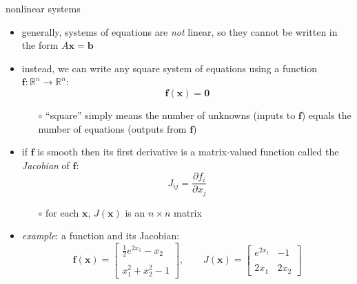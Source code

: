 \documentclass[10pt,hyperref]{beamer}
\newcommand{\bb}{\mathbf{b}}
\newcommand{\bbf}{\mathbf{f}}
\newcommand{\bx}{\mathbf{x}}
\newcommand{\bzero}{\bm{0}}
\newcommand{\RR}{\mathbb{R}}
\begin{document}
\begin{frame}{nonlinear systems}
\begin{itemize}
\item generally, systems of equations are \emph{not} linear, so they cannot be written in the form $A \bx = \bb$
\item instead, we can write any square system of equations using a function $\bbf:\RR^n\to \RR^n$:
    $$\bbf(\bx)=\bzero$$

  \begin{itemize}
  \item[$\circ$] ``square'' simply means the number of unknowns (inputs to $\bbf$) equals the number of equations (outputs from $\bbf$)
  \end{itemize}
\item if $\bbf$ is smooth then its first derivative is a matrix-valued function called the \emph{Jacobian} of $\bbf$:
	$$J_{ij} = \frac{\partial f_i}{\partial x_j}$$

  \begin{itemize}
  \item[$\circ$] for each $\bx$, $J(\bx)$ is an $n\times n$ matrix
  \end{itemize}
\item \emph{example}: a function and its Jacobian:
    $$\bbf(\bx) = \begin{bmatrix} \frac{1}{2} e^{2x_1} - x_2 \\ \\ x_1^2 + x_2^2 - 1 \end{bmatrix}, \qquad
    J(\bx) = \begin{bmatrix} e^{2x_1} & -1 \\ \\
                             2 x_1 & 2 x_2 \end{bmatrix}$$
\end{itemize}
\end{frame}
\end{document}
